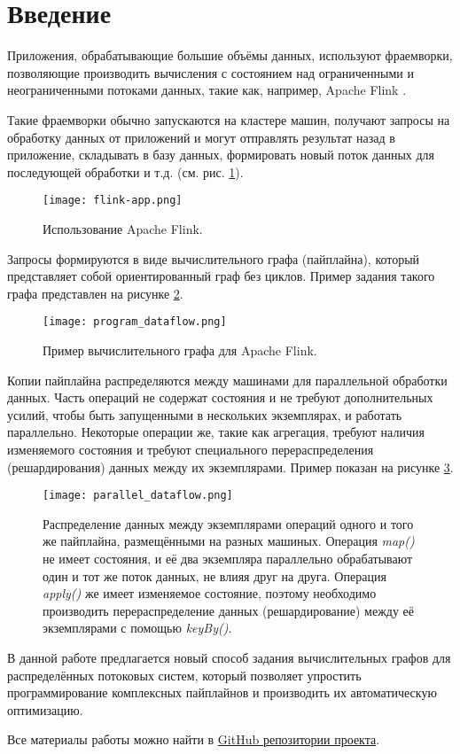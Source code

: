 \section{Введение}

Приложения, обрабатывающие большие объёмы данных, используют фраемворки, позволяющие производить вычисления с состоянием над ограниченными и неограниченными потоками данных, такие как, например, Apache Flink \cite{flink-org}.

Такие фраемворки обычно запускаются на кластере машин, получают запросы на обработку данных от приложений и могут отправлять результат назад в приложение, складывать в базу данных, формировать новый поток данных для последующей обработки и т.д. (см. рис. \ref{fig:flink-app}).

\begin{figure}[h]
    \texttt{[image: flink-app.png]}
    \caption{Использование Apache Flink.}
    \label{fig:flink-app}
\end{figure}

Запросы формируются в виде вычислительного графа (пайплайна), который представляет собой ориентированный граф без циклов. Пример задания такого графа представлен на рисунке \ref{fig:prog-data}.

\begin{figure}
    \texttt{[image: program\_dataflow.png]}
    \caption{Пример вычислительного графа для Apache Flink.}
    \label{fig:prog-data}
\end{figure}

Копии пайплайна распределяются между машинами для параллельной обработки данных.
Часть операций не содержат состояния и не требуют дополнительных усилий, чтобы быть запущенными в нескольких экземплярах, и работать параллельно.
Некоторые операции же, такие как агрегация, требуют наличия изменяемого состояния и требуют специального перераспределения (решардирования) данных между их экземплярами. Пример показан на рисунке \ref{fig:par-data}.

\begin{figure}
    \texttt{[image: parallel\_dataflow.png]}
    \caption{Распределение данных между экземплярами операций одного и того же пайплайна, размещёнными на разных машиных. Операция \textit{map()} не имеет состояния, и её два экземпляра параллельно обрабатывают один и тот же поток данных, не влияя друг на друга. Операция \textit{apply()} же имеет изменяемое состояние, поэтому необходимо производить перераспределение данных (решардирование) между её экземплярами с помощью \textit{keyBy()}.}
    \label{fig:par-data}
\end{figure}

В данной работе предлагается новый способ задания вычислительных графов для распределённых потоковых систем, который позволяет упростить программирование комплексных пайплайнов и производить их автоматическую оптимизацию.

Все материалы работы можно найти в \href{https://github.com/winter-yuki/calco}{GitHub репозитории проекта}.
